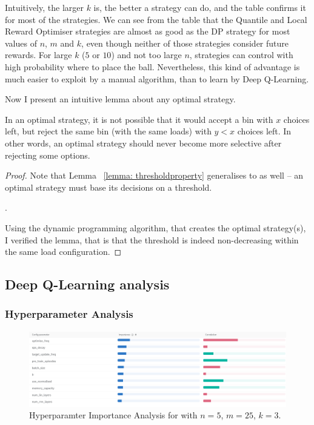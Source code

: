 Intuitively, the larger $k$ is, the better a strategy can do, and the table confirms it for most of the strategies. We can see from the table that the Quantile and Local Reward Optimiser strategies are almost as good as the DP strategy for most values of $n$, $m$ and $k$, even though neither of those strategies consider future rewards. For large $k$ ($5$ or $10$) and not too large $n$, strategies can control with high probability where to place the ball. Nevertheless, this kind of advantage is much easier to exploit by a manual algorithm, than to learn by Deep Q-Learning.



Now I present an intuitive lemma about any optimal strategy.


\begin{lemma} \label{lemma: k-thinning-increasing-threshold}
In an optimal strategy, it is not possible that it would accept a bin with $x$ choices left, but reject the same bin (with the same loads) with $y<x$ choices left. In other words, an optimal strategy should never become more selective after rejecting some options.
\end{lemma}


\begin{proof}
Note that Lemma ~\ref{lemma: thresholdproperty} generalises to \KThinning as well -- an optimal strategy must base its decisions on a threshold.


.


Using the dynamic programming algorithm, that creates the optimal strategy(s), I verified the lemma, that is that the threshold is indeed non-decreasing within the same load configuration.
\end{proof}


\subsection{Deep Q-Learning analysis}



\subsubsection{Hyperparameter Analysis}


\begin{figure}[h] \label{k-thinning-hyperparameter-analysis}
    \centering
    \includegraphics[scale=0.4]{Chapter4/Figs/Hyperparameter_analysis_5_25_3.png}
    \caption{Hyperparamter Importance Analysis for \KThinning with $n=5$, $m=25$, $k=3$. \cite{biewald2020wandb}}
\end{figure}

